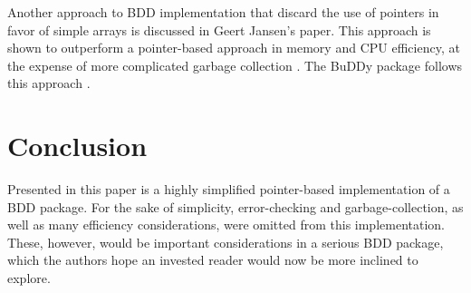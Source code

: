 \documentclass[12pt]{article}
\begin{document}
Another approach to BDD implementation that discard the use of pointers in favor of simple arrays is discussed in Geert Jansen's paper. This approach is shown to outperform a pointer-based approach in memory and CPU efficiency, at the expense of more complicated garbage collection \cite{jansen01}. The BuDDy package follows this approach \cite{buddy}.

\section*{Conclusion}
  
Presented in this paper is a highly simplified pointer-based implementation of a BDD package. For the sake of simplicity, error-checking and garbage-collection, as well as many efficiency considerations, were omitted from this implementation. These, however, would be important considerations in a serious BDD package, which the authors hope an invested reader would now be more inclined to explore.
  



\end{document}
